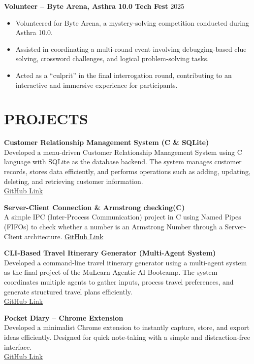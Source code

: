 \documentclass[10pt]{article}
\begin{document}
\textbf{Volunteer – Byte Arena, Asthra 10.0 Tech Fest} \hfill 2025
\begin{itemize}
    \item Volunteered for Byte Arena, a mystery-solving competition conducted during Asthra 10.0.
    \item Assisted in coordinating a multi-round event involving debugging-based clue solving, crossword challenges, and logical problem-solving tasks.
    \item Acted as a “culprit” in the final interrogation round, contributing to an interactive and immersive experience for participants.
\end{itemize}




\section*{PROJECTS}

\textbf{Customer Relationship Management System (C \& SQLite)} \\
Developed a menu-driven Customer Relationship Management System using C language with SQLite as the database backend. The system manages customer records, stores data efficiently, and performs operations such as adding, updating, deleting, and retrieving customer information. \\
\href{https://github.com/deon-george/micro-project_CRMS}{GitHub Link}

\textbf{Server-Client Connection \& Armstrong checking(C)} \\
A simple IPC (Inter-Process Communication) project in C using Named Pipes (FIFOs) to check whether a number is an Armstrong Number through a Server-Client architecture.
\href{https://github.com/deon-george/Server-Client-ArmstrongChecking}{GitHub Link}


\textbf{CLI-Based Travel Itinerary Generator (Multi-Agent System)} \\
Developed a command-line travel itinerary generator using a multi-agent system as the final project of the MuLearn Agentic AI Bootcamp. The system coordinates multiple agents to gather inputs, process travel preferences, and generate structured travel plans efficiently. \\
\href{https://github.com/deon-george/multi_agent_travel_cli}{GitHub Link}


\textbf{Pocket Diary – Chrome Extension} \\
Developed a minimalist Chrome extension to instantly capture, store, and export ideas efficiently. Designed for quick note-taking with a simple and distraction-free interface. \\
\href{https://github.com/deon-george/Pocket_diary}{GitHub Link}
\end{document}
